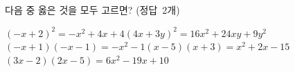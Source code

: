 다음 중 옳은 것을 모두 고르면? \mbox{(정답 2개)}
\begin{choicesv}{$(-x+2)^2=-x^2+4x+4$}{$(4x+3y)^2=16x^2+24xy+9y^2$}{$(-x+1)(-x-1)=-x^2-1$}{$(x-5)(x+3)=x^2+2x-15$}{$(3x-2)(2x-5)=6x^2-19x+10$}\end{choicesv}
